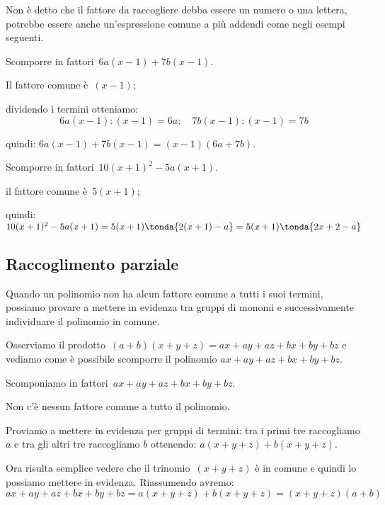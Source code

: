 Non è detto che il fattore da raccogliere debba essere un numero o una lettera, 
potrebbe essere anche un'espressione comune a più addendi come negli esempi 
seguenti.


 \begin{esempio}
Scomporre in fattori~\(6a(x-1)+7b(x-1)\).
  \begin{enumeratea}
  \item Il fattore comune è~\((x-1)\); 
  \item dividendo i termini otteniamo:
\[6a(x-1):(x-1)=6a; \quad 7b(x-1):(x-1)=7b\]
  \item quindi: \quad \(6a(x-1)+7b(x-1)=(x-1)(6a+7b)\).
  \end{enumeratea}
 \end{esempio}

 \begin{esempio}
Scomporre in fattori~\(10(x+1)^{2}-5a(x+1)\).
  \begin{enumeratea}
  \item il fattore comune è~\(5(x+1)\);
  \item quindi: \quad 
  \(10(x+1)^{2}-5a(x+1)=5(x+1)\tonda{2(x+1)-a}=5(x+1)\tonda{2x+2-a}\)
  \end{enumeratea}
 \end{esempio}


% 

\subsection{Raccoglimento parziale}
\label{subsec:divpol_raccoglimentoparziale}

Quando un polinomio non ha alcun fattore comune a tutti i suoi termini, 
possiamo provare a mettere in evidenza tra gruppi di monomi
e successivamente individuare il polinomio in comune.

Osserviamo il prodotto~\((a+b)(x+y+z)=ax+ay+az+bx+by+bz\) e
vediamo come è possibile scomporre il polinomio 
\(ax+ay+az+bx+by+bz\).

 \begin{esempio}
Scomponiamo in fattori~\(ax+ay+az+bx+by+bz\). 

Non c'è nessun fattore comune a tutto il polinomio.

Proviamo a mettere in evidenza per gruppi di termini: tra i primi tre 
raccogliamo \(a\) e tra gli altri tre raccogliamo \(b\) ottenendo:
\(a(x+y+z)+b(x+y+z)\). 

Ora risulta semplice vedere che il trinomio~\((x+y+z)\) è in comune e quindi 
lo possiamo mettere in evidenza. Riassumendo avremo:
\[ax+ay+az+bx+by+bz=a(x+y+z)+b(x+y+z)=(x+y+z)(a+b)\]
 \end{esempio}

